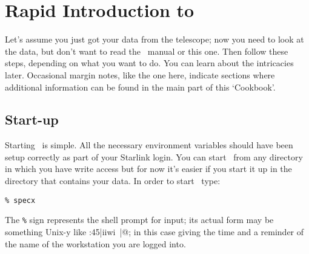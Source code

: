 \begin{center}
\end{center}

\section{Rapid Introduction to \SPECX }
\label{sec:rapid-specx}
Let's assume you just got your data from the telescope; 
now you need to
look at the data, but don't want to read the \SPECX\ manual or this
one. Then follow these steps, depending on what you want to do. You
can learn about the intricacies later. Occasional margin notes, like
the one here, indicate sections where
additional information can be found in the main part of this
`Cookbook'.

\subsection{Start-up}
\label{sec:start-up}

Starting \SPECX\ is simple. All the necessary environment variables should
have been setup correctly as part of your Starlink login.
You can start \SPECX\ from any directory in which you have write access but
for now it's easier if you start it up in the directory that contains your
data. In order to start \SPECX\, type:

\verb|% specx|

\reversemarginpar
The {\tt \%} sign represents the shell prompt for input; its actual
form may be something Unix-y like :45|iiwi~|@; in this case
giving the time and a reminder of the name of the workstation you are
logged into.

